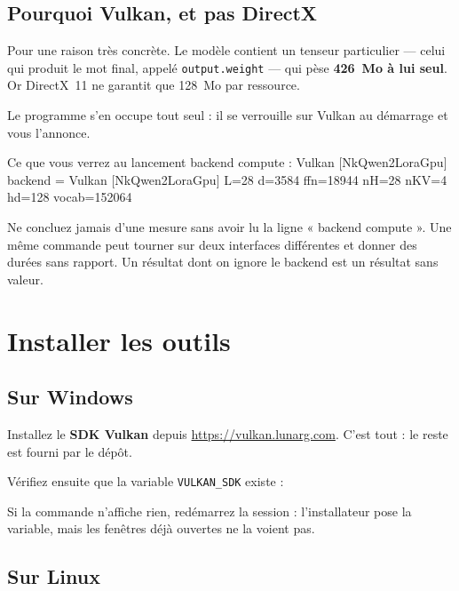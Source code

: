 \subsection{Pourquoi Vulkan, et pas DirectX}

Pour une raison très concrète. Le modèle contient un tenseur particulier —
celui qui produit le mot final, appelé \texttt{output.weight} — qui pèse
\textbf{426~Mo à lui seul}. Or DirectX~11 ne garantit que 128~Mo par ressource.

Le programme s'en occupe tout seul : il se verrouille sur Vulkan au démarrage et
vous l'annonce.

\begin{nkcode}[]{Ce que vous verrez au lancement}
backend compute : Vulkan
  [NkQwen2LoraGpu] backend = Vulkan
  [NkQwen2LoraGpu] L=28 d=3584 ffn=18944 nH=28 nKV=4 hd=128 vocab=152064
\end{nkcode}

\begin{nkpiege}
Ne concluez jamais d'une mesure sans avoir lu la ligne « backend compute ». Une
même commande peut tourner sur deux interfaces différentes et donner des durées
sans rapport. Un résultat dont on ignore le backend est un résultat sans valeur.
\end{nkpiege}

\section{Installer les outils}

\subsection{Sur Windows}

Installez le \textbf{SDK Vulkan} depuis \url{https://vulkan.lunarg.com}. C'est
tout : le reste est fourni par le dépôt.

Vérifiez ensuite que la variable \texttt{VULKAN\_SDK} existe :


Si la commande n'affiche rien, redémarrez la session : l'installateur pose la
variable, mais les fenêtres déjà ouvertes ne la voient pas.

\subsection{Sur Linux}

